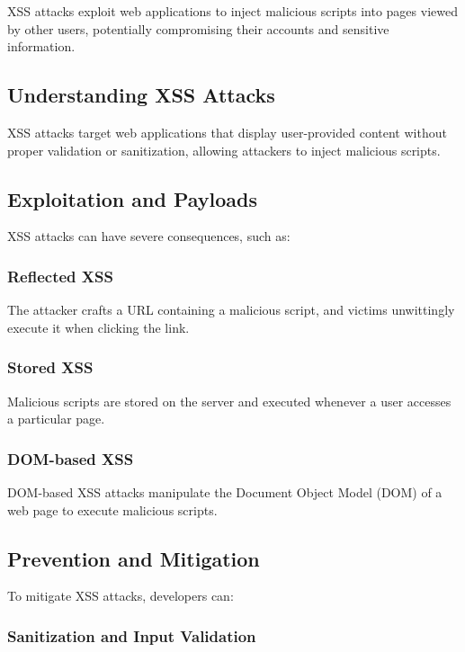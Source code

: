 \documentclass{article}
\begin{document}
XSS attacks exploit web applications to inject malicious scripts into pages viewed by other users, potentially compromising their accounts and sensitive information.

\subsection{Understanding XSS Attacks}

XSS attacks target web applications that display user-provided content without proper validation or sanitization, allowing attackers to inject malicious scripts.

\subsection{Exploitation and Payloads}

XSS attacks can have severe consequences, such as:

\subsubsection{Reflected XSS}

The attacker crafts a URL containing a malicious script, and victims unwittingly execute it when clicking the link.

\subsubsection{Stored XSS}

Malicious scripts are stored on the server and executed whenever a user accesses a particular page.

\subsubsection{DOM-based XSS}

DOM-based XSS attacks manipulate the Document Object Model (DOM) of a web page to execute malicious scripts.

\subsection{Prevention and Mitigation}

To mitigate XSS attacks, developers can:

\subsubsection{Sanitization and Input Validation}
\end{document}
